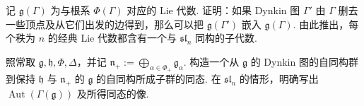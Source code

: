 \begin{exercise*}
记 $\mathfrak g(\Gamma)$ 为与根系 $\Phi(\Gamma)$ 对应的 Lie 代数. 证明：如果 Dynkin 图 $\Gamma'$ 由 $\Gamma$ 删去一些顶点及从它们出发的边得到，那么可以把 $\mathfrak g(\Gamma')$ 嵌入 $\mathfrak g(\Gamma)$. 由此推出，每个秩为 $n$ 的经典 Lie 代数都含有一个与 $\mathfrak{sl}_n$ 同构的子代数.
\end{exercise*}
\begin{exercise*}
照常取 $\mathfrak g,\mathfrak h,\Phi,\Delta$，并记 $\mathfrak n_+:=\bigoplus_{\alpha\in\Phi_+}\mathfrak g_\alpha$. 构造一个从 $\mathfrak g$ 的 Dynkin 图的自同构群到保持 $\mathfrak h$ 与 $\mathfrak n_+$ 的 $\mathfrak g$ 的自同构所成子群的同态.
在 $\mathfrak{sl}_n$ 的情形，明确写出 $\operatorname{Aut}(\Gamma(\mathfrak g))$ 及所得同态的像.
\end{exercise*}
